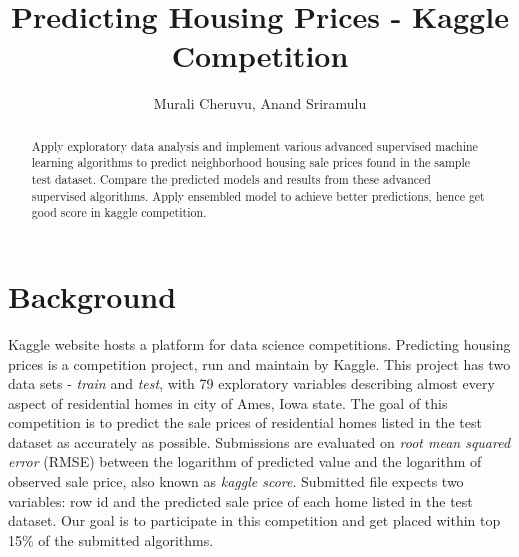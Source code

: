 \documentclass[sigconf]{acmart}
\begin{document}
		
	\title{Predicting Housing Prices - Kaggle Competition}	
	
	\author{Murali Cheruvu, Anand Sriramulu}
	
	\renewcommand{\shortauthors}{M. Cheruvu, A Sriramulu}
	
	
	\begin{abstract}
		
	Apply exploratory data analysis and implement various advanced supervised machine learning algorithms to predict neighborhood housing sale prices found in the sample test dataset. Compare the predicted models and results from these advanced supervised algorithms. Apply ensembled model to achieve better predictions, hence get good score in kaggle competition.
	
	\end{abstract}
	
	
	\maketitle
	
	\section{Background}
	
	Kaggle website hosts a platform for data science competitions. Predicting housing prices is a competition project, run and maintain by Kaggle. This project has two data sets - {\em train} and {\em test}, with 79 exploratory variables describing almost every aspect of residential homes in city of Ames, Iowa state. The goal of this competition is to predict the sale prices of residential homes listed in the test dataset as accurately as possible. Submissions are evaluated on {\em root mean squared error} (RMSE) between the logarithm of predicted value and the logarithm of observed sale price, also known as {\em kaggle score}. Submitted file expects two variables: row id and the predicted sale price of each home listed in the test dataset. Our goal is to participate in this competition and get placed within top 15\% of the submitted algorithms.
	
\end{document}
